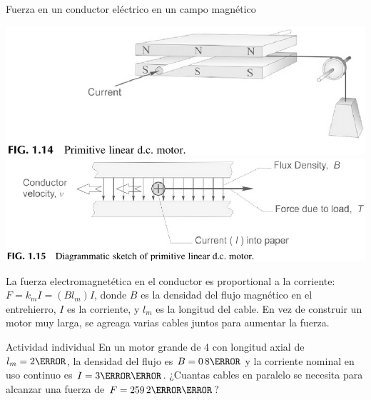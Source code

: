 \documentclass[presentation,aspectratio=169]{beamer}
\begin{document}
\begin{frame}[label={sec:orgda42239}]{Fuerza en un conductor eléctrico en un campo magnético}
\begin{center}
\includegraphics[width=0.4\linewidth]{../../figures/HD-fig1_14.png}
\includegraphics[width=0.53\linewidth]{../../figures/HD-fig1_15.png}
\end{center}

La fuerza electromagnetética en el conductor es proportional a la corriente: \(F=k_mI=(Bl_m)I\), donde \(B\) es la densidad del flujo magnético en el entrehierro, \(I\) es la corriente, y \(l_m\) es la longitud del cable. En vez de construir un motor muy larga, se agreaga varias cables juntos para aumentar la fuerza.

\alert{Actividad individual} En un motor grande de \unit{4}{\mega\watt} con longitud axial de \(l_m=\unit{2}{\meter}\), la densidad del flujo es \(B=\unit{0.8}{\tesla}\) y la corriente nominal en uso continuo es \(I=\unit{3}{\kilo\ampere}\). ¿Cuantas cables en paralelo se necesita para alcanzar una fuerza de \(F=\unit{259.2}{\kilo\newton}\)?
\end{frame}
\end{document}
